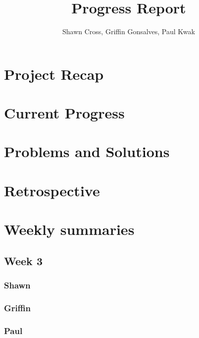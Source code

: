\documentclass[10pt,draftclsnofoot,onecolumn]{IEEEtran}
\begin{document}
\title{Progress Report}
\author{Shawn Cross, Griffin Gonsalves, Paul Kwak}
\maketitle
\hspace*{\fill}\hspace*{\fill}
\vspace{2cm}
\begin{abstract}

\end{abstract}
\IEEEpeerreviewmaketitle

\newpage
{}

\section{Project Recap}

\section{Current Progress}

\section{Problems and Solutions}

\section{Retrospective}

\section{Weekly summaries}
\subsection{Week 3}
\subsubsection{Shawn}
\subsubsection{Griffin}
\subsubsection{Paul}
\end{document}
